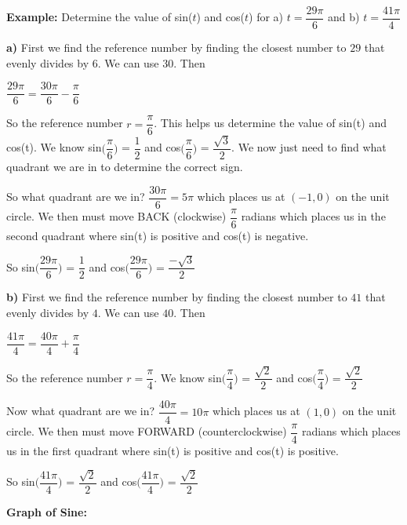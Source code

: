 \documentclass[12pt]{article}
\newenvironment{myindentpar}[1]%
     {\begin{list}{}%
             {\setlength{\leftmargin}{#1}}%
             \item[]%
     }
     {\end{list}}
\begin{document}
\begin{myindentpar}{1cm}
\textbf{Example:} Determine the value of sin($t$) and cos($t$) for a) $t = \dfrac{29 \pi}{6}$ and b) $t = \dfrac{41 \pi}{4}$

\begin{myindentpar}{2cm}
\textbf{a)} First we find the reference number by finding the closest number to $29$ that evenly divides by $6$. We can use $30$. Then
\newline

\centerline{$\dfrac{29 \pi}{6} = \dfrac{30 \pi}{6} - \dfrac{\pi}{6}$}

So the reference number $r = \dfrac{\pi}{6}$. This helps us determine the value of sin(t) and cos(t). We know sin$\Big(\dfrac{\pi}{6}\Big)$ = $\dfrac{1}{2}$ and  cos$\Big(\dfrac{\pi}{6}\Big)$ = $\dfrac{\sqrt{3}}{2}$. We now just need to find what quadrant we are in to determine the correct sign.

So what quadrant are we in? $\dfrac{30 \pi}{6} = 5 \pi$ which places us at $(-1,0)$ on the unit circle. We then must move BACK (clockwise) $\dfrac{\pi}{6}$ radians which places us in the second quadrant where sin(t) is positive and cos(t) is negative.  

So sin$\Big(\dfrac{29 \pi}{6}\Big)$ = $\dfrac{1}{2}$ and  cos$\Big(\dfrac{29 \pi}{6}\Big)$ = $\dfrac{- \sqrt{3}}{2}$

\textbf{b)} First we find the reference number by finding the closest number to $41$ that evenly divides by $4$. We can use $40$. Then
\newline

\centerline{$\dfrac{41 \pi}{4} = \dfrac{40 \pi}{4} + \dfrac{\pi}{4}$}

So the reference number $r = \dfrac{\pi}{4}$. We know sin$\Big(\dfrac{\pi}{4}\Big)$ = $\dfrac{\sqrt{2}}{2}$ and  cos$\Big(\dfrac{\pi}{4}\Big)$ = $\dfrac{\sqrt{2}}{2}$

Now what quadrant are we in? $\dfrac{40 \pi}{4} = 10 \pi$ which places us at $(1,0)$ on the unit circle. We then must move FORWARD (counterclockwise) $\dfrac{\pi}{4}$ radians which places us in the first quadrant where sin(t) is positive and cos(t) is positive.

So sin$\Big(\dfrac{41 \pi}{4}\Big)$ = $\dfrac{\sqrt{2}}{2}$ and  cos$\Big(\dfrac{41 \pi}{4}\Big)$ = $\dfrac{\sqrt{2}}{2}$
\end{myindentpar}
\end{myindentpar}
\vspace{2cm}
\textbf{Graph of Sine:}
\end{document}
